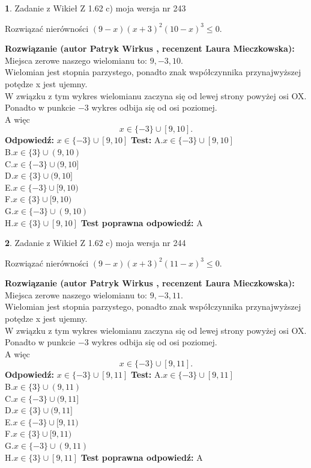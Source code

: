 \documentclass[12pt, a4paper]{article}
\theoremstyle{definition} %
\newtheorem{zad}{}
\newcommand{\zadStart}[1]{\begin{zad}#1\newline}
\newcommand{\zadStop}{\end{zad}}
\newcommand{\rozwStart}[2]{\noindent \textbf{Rozwiązanie (autor #1 , recenzent #2): }\newline}
\newcommand{\rozwStop}{\newline}
\newcommand{\odpStart}{\noindent \textbf{Odpowiedź:}\newline}
\newcommand{\odpStop}{\newline}
\newcommand{\testStart}{\noindent \textbf{Test:}\newline}
\newcommand{\testStop}{\newline}
\newcommand{\kluczStart}{\noindent \textbf{Test poprawna odpowiedź:}\newline}
\newcommand{\kluczStop}{\newline}
\begin{document}
\zadStart{Zadanie z Wikieł Z 1.62 c) moja wersja nr 243}

Rozwiązać nierówności $(9-x)(x+3)^{2}(10-x)^{3}\le0$.
\zadStop
\rozwStart{Patryk Wirkus}{Laura Mieczkowska}
Miejsca zerowe naszego wielomianu to: $9, -3, 10$.\\
Wielomian jest stopnia parzystego, ponadto znak współczynnika przy\linebreak najwyższej potędze x jest ujemny.\\ W związku z tym wykres wielomianu zaczyna się od lewej strony powyżej osi OX.\\
Ponadto w punkcie $-3$ wykres odbija się od osi poziomej.\\
A więc $$x \in \{-3\} \cup [9,10].$$
\rozwStop
\odpStart
$x \in \{-3\} \cup [9,10]$
\odpStop
\testStart
A.$x \in \{-3\} \cup [9,10]$\\
B.$x \in \{3\} \cup (9,10)$\\
C.$x \in \{-3\} \cup (9,10]$\\
D.$x \in \{3\} \cup (9,10]$\\
E.$x \in \{-3\} \cup [9,10)$\\
F.$x \in \{3\} \cup [9,10)$\\
G.$x \in \{-3\} \cup (9,10)$\\
H.$x \in \{3\} \cup [9,10]$
\testStop
\kluczStart
A
\kluczStop



\zadStart{Zadanie z Wikieł Z 1.62 c) moja wersja nr 244}

Rozwiązać nierówności $(9-x)(x+3)^{2}(11-x)^{3}\le0$.
\zadStop
\rozwStart{Patryk Wirkus}{Laura Mieczkowska}
Miejsca zerowe naszego wielomianu to: $9, -3, 11$.\\
Wielomian jest stopnia parzystego, ponadto znak współczynnika przy\linebreak najwyższej potędze x jest ujemny.\\ W związku z tym wykres wielomianu zaczyna się od lewej strony powyżej osi OX.\\
Ponadto w punkcie $-3$ wykres odbija się od osi poziomej.\\
A więc $$x \in \{-3\} \cup [9,11].$$
\rozwStop
\odpStart
$x \in \{-3\} \cup [9,11]$
\odpStop
\testStart
A.$x \in \{-3\} \cup [9,11]$\\
B.$x \in \{3\} \cup (9,11)$\\
C.$x \in \{-3\} \cup (9,11]$\\
D.$x \in \{3\} \cup (9,11]$\\
E.$x \in \{-3\} \cup [9,11)$\\
F.$x \in \{3\} \cup [9,11)$\\
G.$x \in \{-3\} \cup (9,11)$\\
H.$x \in \{3\} \cup [9,11]$
\testStop
\kluczStart
A
\kluczStop
\end{document}
